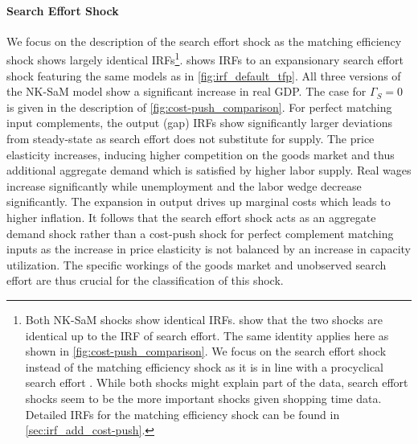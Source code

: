 \documentclass[12pt,3p,authoryear,review]{elsarticle}
\begin{document}
\paragraph{Search Effort Shock}
We focus on the description of the search effort shock as the matching efficiency shock shows largely identical IRFs\footnote{Both NK-SaM shocks show identical IRFs. \cite{bai2025demand} show that the two shocks are identical up to the IRF of search effort. The same identity applies here as shown in \cref{fig:cost-push_comparison}. We focus on the search effort shock instead of the matching efficiency shock as it is in line with a procyclical search effort \citep{petrosky-nadeauShoppingTime2016}. While both shocks might explain part of the data, search effort shocks seem to be the more important shocks given shopping time data. Detailed IRFs for the matching efficiency shock can be found in \ref{sec:irf_add_cost-push}.}.  shows IRFs to an expansionary search effort shock featuring the same models as in \cref{fig:irf_default_tfp}. All three versions of the NK-SaM model show a significant increase in real GDP. The case for $\Gamma_S = 0$ is given in the description of \cref{fig:cost-push_comparison}. For perfect matching input complements, the output (gap) IRFs show significantly larger deviations from steady-state as search effort does not substitute for supply. The price elasticity increases, inducing higher competition on the goods market and thus additional aggregate demand which is satisfied by higher labor supply. Real wages increase significantly while unemployment and the labor wedge decrease significantly. The expansion in output drives up marginal costs which leads to higher inflation. It follows that the search effort shock acts as an aggregate demand shock rather than a cost-push shock for perfect complement matching inputs as the increase in price elasticity is not balanced by an increase in capacity utilization. The specific workings of the goods market and unobserved search effort are thus crucial for the classification of this shock.\\%
\end{document}
